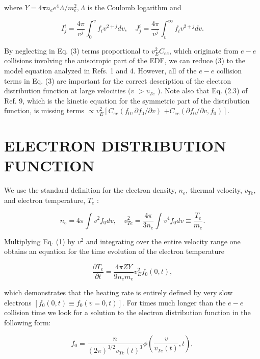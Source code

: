 \documentclass[oneside,onecolumn]{article}
\begin{document}
\begin{sloppypar}
 where $Y=4 \pi n_{e} e^{4} \Lambda / m_{e}^{2}, \Lambda$ is the Coulomb logarithm and
 
 \begin{dmath*}[compact]
 I_{j}^{i}=\frac{4 \pi}{v^{j}} \int_{0}^{v} f_{i} v^{2+j} d v, \quad J_{j}^{i}=\frac{4 \pi}{v^{j}} \int_{v}^{\infty} f_{i} v^{2+j} d v .
 \end{dmath*}
 
 By neglecting in Eq. (3) terms proportional to $v_{E}^{2} C_{e e}$, which originate from $e-e$ collisions involving the anisotropic part of the EDF, we can reduce (3) to the model equation analyzed in Refs. 1 and 4. However, all of the $e-e$ collision terms in Eq. (3) are important for the correct description of the electron distribution function at large velocities $(v$ $>v_{T e}$ ). Note also that Eq. (2.3) of Ref. 9, which is the kinetic equation for the symmetric part of the distribution function, is missing terms $\propto v_{E}^{2}\left[C_{e e}\left(f_{0}, \partial f_{0} / \partial v\right)\right.$ $\left.+C_{e e}\left(\partial f_{0} / \partial v, f_{0}\right)\right]$.
 
 \section{ELECTRON DISTRIBUTION FUNCTION}
 We use the standard definition for the electron density, $n_{e}$, thermal velocity, $v_{T e}$, and electron temperature, $T_{e}$ :
 
 \begin{dmath}[compact]
 n_{e}=4 \pi \int v^{2} f_{0} d v, \quad v_{T e}^{2}=\frac{4 \pi}{3 n_{e}} \int v^{4} f_{0} d v \equiv \frac{T_{e}}{m_{e}} .
 \end{dmath}
 
 Multiplying Eq. (1) by $v^{2}$ and integrating over the entire velocity range one obtains an equation for the time evolution of the electron temperature
 
 \begin{dmath}[compact]
 \frac{\partial T_{e}}{\partial t}=\frac{4 \pi Z Y}{9 n_{e} m_{e}} v_{E}^{2} f_{0}(0, t),
 \end{dmath}
 
 which demonstrates that the heating rate is entirely defined by very slow electrons $\left[f_{0}(0, t) \equiv f_{0}(v=0, t)\right]$. For times much longer than the $e-e$ collision time we look for a solution to the electron distribution function in the following form:
 
 \begin{dmath}[compact]
 f_{0}=\frac{n}{(2 \pi)^{3 / 2} v_{T e}(t)^{3}} \phi\left(\frac{v}{v_{T e}(t)}, t\right),
 \end{dmath}
 

\end{sloppypar}
\end{document}

